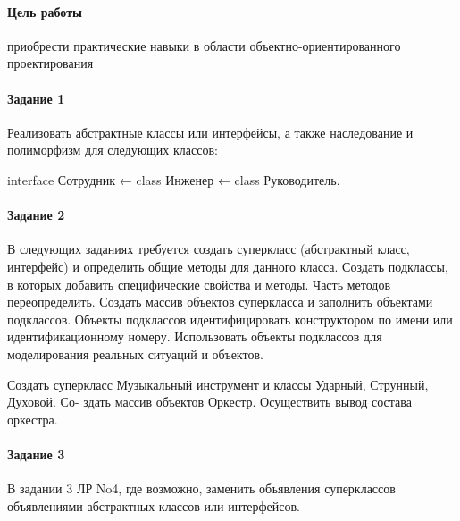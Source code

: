 \newcommand{\basefile}{../../src/ssp_po5/reports/Karnasevich/5/src/main5/}

\paragraph{Цель работы}
приобрести практические навыки в области объектно-ориентированного проектирования


\paragraph{Задание 1}
Реализовать абстрактные классы или интерфейсы, а также наследование и полиморфизм для
следующих классов:

interface Сотрудник ← class Инженер ← class Руководитель.






\paragraph{Задание 2}
В следующих заданиях требуется создать суперкласс (абстрактный класс, интерфейс) и определить
общие методы для данного класса. Создать подклассы, в которых добавить специфические
свойства и методы. Часть методов переопределить. Создать массив объектов суперкласса и заполнить
объектами подклассов. Объекты подклассов идентифицировать конструктором по имени или
идентификационному номеру. Использовать объекты подклассов для моделирования реальных
ситуаций и объектов.

Создать суперкласс Музыкальный инструмент и классы Ударный, Струнный, Духовой. Со-
здать массив объектов Оркестр. Осуществить вывод состава оркестра.








\paragraph{Задание 3}
В задании 3 ЛР No4, где возможно, заменить объявления суперклассов объявлениями абстрактных
классов или интерфейсов.







